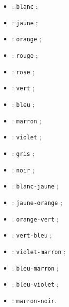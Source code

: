 \documentclass[french,11pt,a4paper]{article}
\begin{document}
\begin{itemize}
	\item {} : \texttt{blanc} ;
	\item {}  : \texttt{jaune} ;
	\item {}  : \texttt{orange} ;
	\item {}  : \texttt{rouge} ;
	\item {}  : \texttt{rose} ;
	\item {}  : \texttt{vert} ;
	\item {}  : \texttt{bleu} ;
	\item {}  : \texttt{marron} ;
	\item {}  : \texttt{violet} ;
	\item {}  : \texttt{gris} ;
	\item {}  : \texttt{noir} ;
	\item {}  : \texttt{blanc-jaune} ;
	\item {}  : \texttt{jaune-orange} ;
	\item {}  : \texttt{orange-vert} ;
	\item {}  : \texttt{vert-bleu} ;
	\item {}  : \texttt{violet-marron} ;
	\item {}  : \texttt{bleu-marron} ;
	\item {}  : \texttt{bleu-violet} ;
	\item {}  : \texttt{marron-noir}.
\end{itemize}

\medskip
\end{document}
